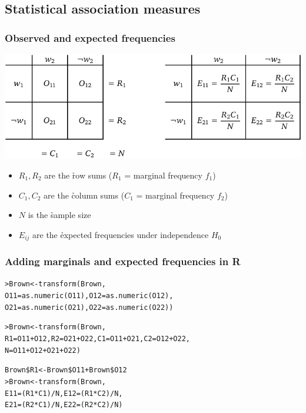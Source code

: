 \documentclass[handout,notes=show,t]{beamer} %
\begin{document}
\subsection{Statistical association measures}

\begin{frame}
  \frametitle{Observed and expected frequencies}
  
  \begin{center}
    \includegraphics[width=\textwidth]{img/cont_table_observed_expected}
  \end{center}

  \begin{itemize}
  \item $R_1, R_2$ are the \h{row sums} ($R_1$ = marginal frequency $f_1$)
  \item $C_1, C_2$ are the \h{column sums} ($C_1$ = marginal frequency $f_2$)
  \item $N$ is the \h{sample size}
  \item $E_{ij}$ are the \h{expected frequencies} under independence $H_0$
  \end{itemize}
\end{frame}

\begin{frame}[fragile]
  \frametitle{Adding marginals and expected frequencies in R}

  \ungap[1.5]
  \begin{alltt}
> Brown <- transform(Brown,
  O11=as.numeric(O11), O12=as.numeric(O12),
  O21=as.numeric(O21), O22=as.numeric(O22))

> Brown <- transform(Brown,
  R1=O11+O12, R2=O21+O22, C1=O11+O21, C2=O12+O22,
  N=O11+O12+O21+O22)

Brown\$R1 <- Brown\$O11 + Brown\$O12 
\pause
> Brown <- transform(Brown,
  E11=(R1*C1)/N, E12=(R1*C2)/N,
  E21=(R2*C1)/N, E22=(R2*C2)/N)
  \end{alltt}
\end{frame}
\end{document}
